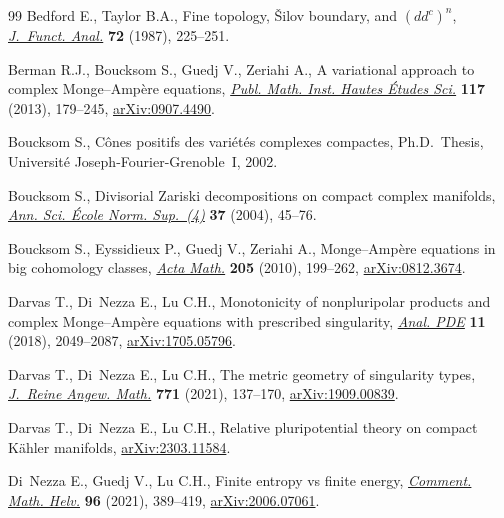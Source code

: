 \documentclass[11pt]{article}
\numberwithin{equation}{section}
\numberwithin{equation}{section}
\theoremstyle{plain}
\begin{document}
\begin{thebibliography}{99}
Bedford E., Taylor B.A., Fine topology, \v{S}ilov boundary, and {$(dd^c)^n$},
 \href{https://doi.org/10.1016/0022-1236(87)90087-5}{\textit{J.~Funct. Anal.}} \textbf{72} (1987), 225--251.

Berman R.J., Boucksom S., Guedj V., Zeriahi A., A variational approach to
 complex {M}onge--{A}mp\`ere equations, \href{https://doi.org/10.1007/s10240-012-0046-6}{\textit{Publ. Math. Inst. Hautes
 \'Etudes Sci.}} \textbf{117} (2013), 179--245, \href{https://arxiv.org/abs/0907.4490}{arXiv:0907.4490}.

Boucksom S., C\^ones positifs des vari\'et\'es complexes compactes, Ph.D.~Thesis, {U}niversit\'e {J}oseph-{F}ourier-{G}renoble~{I}, 2002.

Boucksom S., Divisorial {Z}ariski decompositions on compact complex manifolds,
 \href{https://doi.org/10.1016/j.ansens.2003.04.002}{\textit{Ann. Sci. \'Ecole Norm. Sup.~(4)}} \textbf{37} (2004), 45--76.

Boucksom S., Eyssidieux P., Guedj V., Zeriahi A., Monge--{A}mp\`ere equations
 in big cohomology classes, \href{https://doi.org/10.1007/s11511-010-0054-7}{\textit{Acta Math.}} \textbf{205} (2010), 199--262,
 \href{https://arxiv.org/abs/0812.3674}{arXiv:0812.3674}.

Darvas T., Di~Nezza E., Lu C.H., Monotonicity of nonpluripolar products and
 complex {M}onge--{A}mp\`ere equations with prescribed singularity,
 \href{https://doi.org/10.2140/apde.2018.11.2049}{\textit{Anal. PDE}} \textbf{11} (2018), 2049--2087, \href{https://arxiv.org/abs/1705.05796}{arXiv:1705.05796}.

Darvas T., Di~Nezza E., Lu C.H., The metric geometry of singularity types,
 \href{https://doi.org/10.1515/crelle-2020-0019}{\textit{J.~Reine Angew. Math.}} \textbf{771} (2021), 137--170,
 \href{https://arxiv.org/abs/1909.00839}{arXiv:1909.00839}.

Darvas T., Di~Nezza E., Lu C.H., Relative pluripotential theory on compact
 {K}\"ahler manifolds, \href{https://arxiv.org/abs/2303.11584}{arXiv:2303.11584}.

Di~Nezza E., Guedj V., Lu C.H., Finite entropy vs finite energy,
 \href{https://doi.org/10.4171/cmh/515}{\textit{Comment. Math. Helv.}} \textbf{96} (2021), 389--419,
 \href{https://arxiv.org/abs/2006.07061}{arXiv:2006.07061}.


\end{thebibliography}
\end{document}
